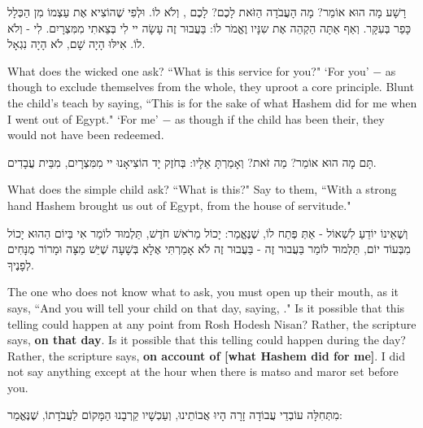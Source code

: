 רָשָׁע מָה הוּא אוֹמֵר? מָה הָעֲבֹדָה הַזֹּאת לָכֶם? לָכֶם , וְלֹא לוֹ. וּלְפִי שֶׁהוֹצִיא אֶת עַצְמוֹ מִן הַכְּלָל כָּפַר בְּעִקָּר. וְאַף אַתָּה הַקְהֵה אֶת שִנָּיו וֶאֱמֹר לוֹ: בַּעֲבוּר זֶה עָשָׂה יי לִי בְּצֵאתִי מִמִּצְרָיִם. לִי - וְלֹא לוֹ. אִילּוּ הָיָה שָׁם, לֹא הָיָה נִגְאָל.

\begin{english}
What does the wicked one ask? ``What is this service for you?" `For you' $-$ as though to exclude themselves from the whole, they uproot a core principle. Blunt the child's teach by saying, ``This is for the sake of what Hashem did for me when I went out of Egypt." `For me' $-$ as though if the child has been their, they would not have been redeemed.
\end{english}

תָּם מָה הוּא אוֹמֵר? מַה זֹּאת? וְאָמַרְתָּ אֵלָיו: בְּחֹזֶק יָד הוֹצִיאָנוּ יי מִמִּצְרָיִם, מִבֵּית עֲבָדִים.

\begin{english}
What does the simple child ask? ``What is this?" Say to them, ``With a strong hand Hashem brought us out of Egypt, from the house of servitude."
\end{english}

וְשֶׁאֵינוֹ יוֹדֵעַ לִשְׁאוֹל - אַתְּ פְּתַח לוֹ, שֶׁנֶּאֱמַר: יָכוֹל מֵרֹאשׁ חֹדֶשׁ, תַּלְמוּד לוֹמַר  אִי בַּיוֹם הַהוּא יָכוֹל מִבְּעוֹד יוֹם, תַּלְמוּד לוֹמַר בַּעֲבוּר זֶה - בַּעֲבוּר זֶה לֹא אָמַרְתִּי אֶלָא בְּשָׁעָה שֶׁיֵּשׁ מַצָּה וּמָרוֹר מֻנָּחִים לְפָנֶיךָ.

\begin{english}
The one who does not know what to ask, you must open up their mouth, as it says, ``And you will tell your child on that day, saying, ." Is it possible that this telling could happen at any point from Rosh Hodesh Nisan? Rather, the scripture says, {\bfseries on that day}. Is it possible that this telling could happen during the day? Rather, the scripture says, {\bfseries on account of [what Hashem did for me]}. I did not say anything except at the hour when there is matso and maror set before you.
\end{english}

\vspace{1em}

מִתְּחִלָּה עוֹבְדֵי עֲבוֹדָה זָרָה הָיוּ אֲבוֹתֵינוּ, וְעַכְשָׁיו קֵרְבָנוּ הַמָּקוֹם לַעֲבֹדָתוֹ, 
שֶׁנֶּאֱמַר:

